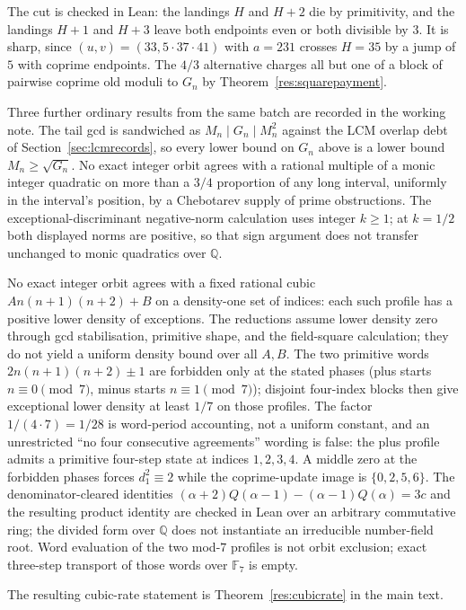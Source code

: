 \documentclass[11pt]{article}
\begin{document}
The cut is checked in Lean: the landings $H$ and $H+2$ die by primitivity, and
the landings $H+1$ and $H+3$ leave both endpoints even or both divisible by
$3$.  It is sharp, since $(u,v)=(33,5\cdot37\cdot41)$ with $a=231$ crosses
$H=35$ by a jump of $5$ with coprime endpoints.  The $4/3$ alternative charges
all but one of a block of pairwise coprime old moduli to $G_n$ by
Theorem~\ref{res:squarepayment}.

Three further ordinary results from the same batch are recorded in the working
note.  The tail gcd is sandwiched as $M_n\mid G_n\mid M_n^2$ against the LCM
overlap debt of Section~\ref{sec:lcmrecords}, so every lower bound on $G_n$
above is a lower bound $M_n\ge\sqrt{G_n}$.  No exact integer orbit agrees with a
rational multiple of a monic integer quadratic on more than a $3/4$ proportion
of any long interval, uniformly in the interval's position, by a Chebotarev
supply of prime obstructions.  The exceptional-discriminant negative-norm
calculation uses integer $k\ge1$; at $k=1/2$ both displayed norms are positive,
so that sign argument does not transfer unchanged to monic quadratics over
$\mathbb Q$.

No exact integer orbit agrees with a fixed rational cubic
$An(n+1)(n+2)+B$ on a density-one set of indices: each such profile has a
positive lower density of exceptions.  The reductions assume lower density
zero through gcd stabilisation, primitive shape, and the field-square
calculation; they do not yield a uniform density bound over all $A,B$.  The
two primitive words $2n(n+1)(n+2)\pm1$ are forbidden only at the stated
phases (plus starts $n\equiv0\pmod7$, minus starts $n\equiv1\pmod7$); disjoint
four-index blocks then give exceptional lower density at least $1/7$ on those
profiles.  The factor $1/(4\cdot7)=1/28$ is word-period accounting, not a uniform
constant, and an unrestricted ``no four consecutive agreements'' wording is
false: the plus profile admits a primitive four-step state at indices
$1,2,3,4$.  A middle zero at the forbidden phases forces $d_1^2\equiv2$ while
the coprime-update image is $\{0,2,5,6\}$.  The denominator-cleared identities
$(\alpha+2)Q(\alpha-1)-(\alpha-1)Q(\alpha)=3c$ and the resulting product identity
are checked in Lean over an arbitrary commutative ring; the divided form over
$\mathbb Q$ does not instantiate an irreducible number-field root.  Word
evaluation of the two mod-$7$ profiles is not orbit exclusion; exact three-step
transport of those words over $\mathbb F_7$ is empty.

The resulting cubic-rate statement is Theorem~\ref{res:cubicrate}
in the main text.
\end{document}
